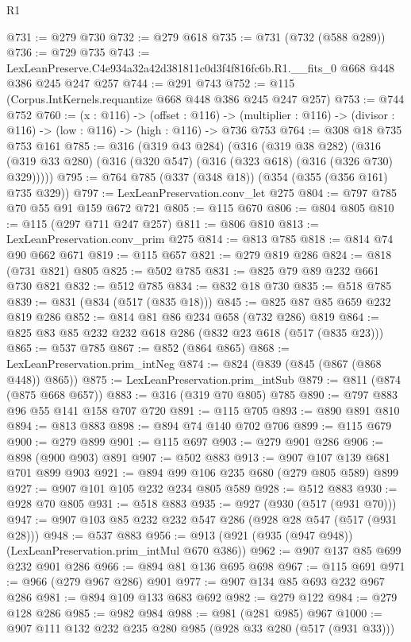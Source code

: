 \begin{lexlean}{R1}
\begin{coremodule}
@731 := @279 @730
@732 := @279 @618
@735 := @731 (@732 (@588 @289))
@736 := @729 @735
@743 := LexLeanPreserve.C4e934a32a42d381811c0d3f4f816fc6b.R1.__fits_0 @668 @448 @386 @245 @247 @257
@744 := @291 @743
@752 := @115 (Corpus.IntKernels.requantize @668 @448 @386 @245 @247 @257)
@753 := @744 @752
@760 := (x : @116) ->
  (offset : @116) ->
  (multiplier : @116) -> (divisor : @116) -> (low : @116) -> (high : @116) -> @736 @753
@764 := @308 @18 @735 @753 @161
@785 := @316
    (@319 @43 @284)
    (@316
      (@319 @38 @282)
      (@316 (@319 @33 @280) (@316 (@320 @547) (@316 (@323 @618) (@316 (@326 @730) @329)))))
@795 := @764 @785 (@337 (@348 @18)) (@354 (@355 (@356 @161) @735 @329))
@797 := LexLeanPreservation.conv_let @275
@804 := @797 @785 @70 @55 @91 @159 @672 @721
@805 := @115 @670
@806 := @804 @805
@810 := @115 (@297 @711 @247 @257)
@811 := @806 @810
@813 := LexLeanPreservation.conv_prim @275
@814 := @813 @785
@818 := @814 @74 @90 @662 @671
@819 := @115 @657
@821 := @279 @819 @286
@824 := @818 (@731 @821) @805
@825 := @502 @785
@831 := @825 @79 @89 @232 @661 @730 @821
@832 := @512 @785
@834 := @832 @18 @730
@835 := @518 @785
@839 := @831 (@834 (@517 (@835 @18)))
@845 := @825 @87 @85 @659 @232 @819 @286
@852 := @814 @81 @86 @234 @658 (@732 @286) @819
@864 := @825 @83 @85 @232 @232 @618 @286 (@832 @23 @618 (@517 (@835 @23)))
@865 := @537 @785
@867 := @852 (@864 @865)
@868 := LexLeanPreservation.prim_intNeg
@874 := @824 (@839 (@845 (@867 (@868 @448)) @865))
@875 := LexLeanPreservation.prim_intSub
@879 := @811 (@874 (@875 @668 @657))
@883 := @316 (@319 @70 @805) @785
@890 := @797 @883 @96 @55 @141 @158 @707 @720
@891 := @115 @705
@893 := @890 @891 @810
@894 := @813 @883
@898 := @894 @74 @140 @702 @706
@899 := @115 @679
@900 := @279 @899
@901 := @115 @697
@903 := @279 @901 @286
@906 := @898 (@900 @903) @891
@907 := @502 @883
@913 := @907 @107 @139 @681 @701 @899 @903
@921 := @894 @99 @106 @235 @680 (@279 @805 @589) @899
@927 := @907 @101 @105 @232 @234 @805 @589
@928 := @512 @883
@930 := @928 @70 @805
@931 := @518 @883
@935 := @927 (@930 (@517 (@931 @70)))
@947 := @907 @103 @85 @232 @232 @547 @286 (@928 @28 @547 (@517 (@931 @28)))
@948 := @537 @883
@956 := @913 (@921 (@935 (@947 @948)) (LexLeanPreservation.prim_intMul @670 @386))
@962 := @907 @137 @85 @699 @232 @901 @286
@966 := @894 @81 @136 @695 @698
@967 := @115 @691
@971 := @966 (@279 @967 @286) @901
@977 := @907 @134 @85 @693 @232 @967 @286
@981 := @894 @109 @133 @683 @692
@982 := @279 @122
@984 := @279 @128 @286
@985 := @982 @984
@988 := @981 (@281 @985) @967
@1000 := @907 @111 @132 @232 @235 @280 @985 (@928 @33 @280 (@517 (@931 @33)))

\end{coremodule}
\end{lexlean}
